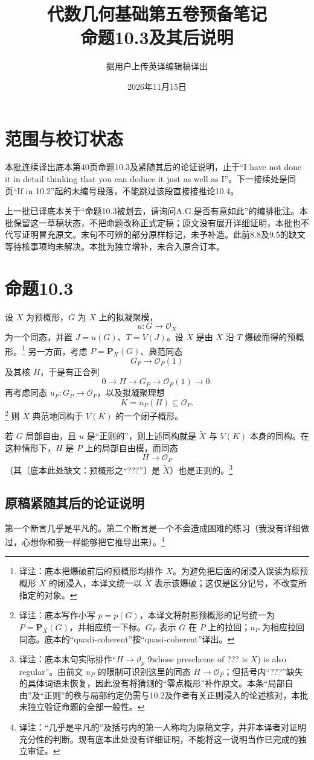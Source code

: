 \documentclass[openany]{ctexbook}
\title{代数几何基础第五卷预备笔记\\命题10.3及其后说明}
\author{据用户上传英译编辑稿译出}
\date{2026年11月15日}
\newcommand{\note}[1]{\footnote{译注：#1}}
\begin{document}
\maketitle
\chapter*{范围与校订状态}
本批连续译出底本第40页命题10.3及紧随其后的论证说明，止于“I have not done it in detail thinking that you can deduce it just as well as I”。下一接续处是同页“If in 10.2”起的未编号段落，不能跳过该段直接接推论10.4。

上一批已译底本关于“命题10.3被划去，请询问A.G.是否有意如此”的编排批注。本批保留这一草稿状态，不把命题改称正式定稿；原文没有展开详细证明，本批也不代写证明冒充原文。末句不可辨的部分原样标记，未予补造。此前8.8及9.5的缺文等待核事项均未解决。本批为独立增补，未合入原合订本。
\chapter*{命题10.3}
设 $X$ 为预概形，$G$ 为 $X$ 上的拟凝聚模，
\[
u:G\longrightarrow\mathcal O_X
\]
为一个同态，并置 $J=u(G)$、$T=V(J)$。设 $\widetilde X$ 是由 $X$ 沿 $T$ 爆破而得的预概形。\note{底本把爆破前后的预概形均排作 $X$。为避免把后面的闭浸入误读为原预概形 $X$ 的闭浸入，本译文统一以 $\widetilde X$ 表示该爆破；这仅是区分记号，不改变所指定的对象。}
另一方面，考虑 $P=\mathbf P_X(G)$、典范同态
\[
G_P\longrightarrow\mathcal O_P(1)
\]
及其核 $H$，于是有正合列
\[
0\longrightarrow H\longrightarrow G_P
\longrightarrow\mathcal O_P(1)\longrightarrow0.
\]
再考虑同态 $u_P:G_P\to\mathcal O_P$，以及拟凝聚理想
\[
K=u_P(H)\subseteq\mathcal O_P.
\]
\note{底本写作小写 $p=p(G)$，本译文将射影预概形的记号统一为 $P=\mathbf P_X(G)$，并相应统一下标。$G_P$ 表示 $G$ 在 $P$ 上的拉回；$u_P$ 为相应拉回同态。底本的“quadi-coherent”按“quasi-coherent”译出。}
则 $\widetilde X$ 典范地同构于 $V(K)$ 的一个闭子概形。

若 $G$ 局部自由，且 $u$ 是“正则的”，则上述同构就是 $\widetilde X$ 与 $V(K)$ 本身的同构。在这种情形下，$H$ 是 $P$ 上的局部自由模，而同态
\[
H\longrightarrow\mathcal O_P
\]
（其〔底本此处缺文：预概形之“???”〕是 $\widetilde X$）也是正则的。\note{底本末句实际排作“$H\to\vartheta_p$ 9whose prescheme of ??? is $X$) is also regular”。由前文 $u_P$ 的限制可识别这里的同态 $H\to\mathcal O_P$；但括号内“???”缺失的具体词语未恢复，因此没有将猜测的“零点概形”补作原文。本条“局部自由”及“正则”的秩与局部约定仍需与10.2及作者有关正则浸入的论述核对，本批未独立验证命题的全部一般性。}

\section*{原稿紧随其后的论证说明}
第一个断言几乎是平凡的。第二个断言是一个不会造成困难的练习（我没有详细做过，心想你和我一样能够把它推导出来）。\note{“几乎是平凡的”及括号内的第一人称均为原稿文字，并非本译者对证明充分性的判断。现有底本此处没有详细证明，不能将这一说明当作已完成的独立审证。}
\end{document}
